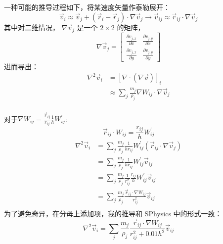 \begin{frame}
    一种可能的推导过程如下，将某速度矢量作泰勒展开：
    \begin{equation}
        \vec{v}_i \approx
        \vec{v}_j + (\vec{r}_i - \vec{r}_j)\cdot \nabla\vec{v}_j
        \to
        \vec{v}_{ij} \approx \vec{r}_{ij}\cdot \nabla\vec{v}_j
    \end{equation}
    其中对二维情况，
    $\nabla \vec{v}_j$ 是一个 $2\times 2$ 的矩阵，
    \begin{equation}
        \nabla\vec{v}_j =
    \begin{bmatrix}
        \frac{\partial v_{j,x}}{\partial x} & \frac{\partial v_{j,y}}{\partial x} \\
        \frac{\partial v_{j,x}}{\partial y} & \frac{\partial v_{j,y}}{\partial y} 
    \end{bmatrix}
    \end{equation}
    进而导出：
        \begin{equation}
            \begin{aligned}
                \nabla^2\vec{v}_i &= [\nabla\cdot (\nabla\vec{v})]_i\\
                &\approx \sum_j \frac{m_j}{\rho_j} \nabla W_{ij}
                \cdot \nabla\vec{v}_j\\
            \end{aligned}
        \end{equation}
\end{frame}

\begin{frame}
    对于$\nabla W_{ij} = \frac{\vec{r}_{ij}}{r_{ij}}\frac{1}{h}W^\prime_{ij}$:
    \begin{equation}
        \vec{r}_{ij}\cdot W_{ij} = \frac{r_{ij}}{h}W^\prime_{ij}
    \end{equation}
    \begin{equation}
        \begin{aligned}
            \nabla^2\vec{v}_i &= 
        \sum_j \frac{m_j}{\rho_j} \frac{1}{h r_{ij}}W^\prime_{ij}
        (\vec{r}_{ij} \cdot \nabla\vec{v}_j)\\
        &=
        \sum_j \frac{m_j}{\rho_j} \frac{1}{h r_{ij}}W^\prime_{ij}\vec{v}_{ij}\\
        &=
        \sum_j \frac{m_j}{\rho_j} \frac{1}{r_{ij}^2} \frac{r_{ij}}{h}W^\prime_{ij}\vec{v}_{ij}\\
        &=
        \sum_j \frac{m_j}{\rho_j} \frac{\vec{r}_{ij}\cdot \nabla W_{ij}}{r_{ij}^2} \vec{v}_{ij}\\
        \end{aligned}
    \end{equation}
    为了避免奇异，在分母上添加项，我的推导和 SPhysics 中的形式一致：
    \begin{equation}
        \nabla^2\vec{v}_i = 
        \sum_j \frac{m_j}{\rho_j} \frac{\vec{r}_{ij}\cdot \nabla W_{ij}}{r_{ij}^2+0.01h^2} \vec{v}_{ij}
    \end{equation}
\end{frame}

